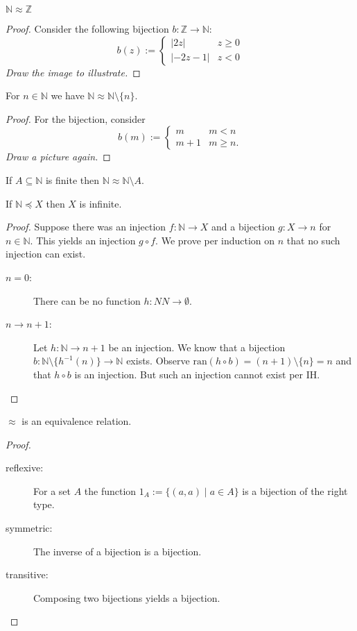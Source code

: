\documentclass{whrartcl}
\newcommand{\NN}{\mathbb{N}}
\newcommand{\ZZ}{\mathbb{Z}}
\newcommand{\ran}{\text{ran}}
\newcommand{\abs}[1]{|#1|}
\begin{document}
\begin{lemma}
  $\NN \approx \ZZ$
\end{lemma}
\begin{proof}
  Consider the following bijection $b : \ZZ \to \NN$:
  \[
    b(z) :=
    \begin{cases}
      \abs{2z} & z \geq 0 \\
      \abs{-2z - 1} & z < 0
    \end{cases}
  \]
  \emph{Draw the image to illustrate.}
\end{proof}

\begin{lemma}
  For $n \in \NN$ we have $\NN \approx \NN \setminus \{n\}$.
\end{lemma}
\begin{proof}
  For the bijection, consider
  \[
    b(m) :=
    \begin{cases}
      m & m < n \\
      m + 1 & m \geq n.
    \end{cases}
  \]
  \emph{Draw a picture again.}
\end{proof}

\begin{corollary}
  If $A \subseteq \NN$ is finite then $\NN \approx \NN \setminus A$.
\end{corollary}

\begin{lemma}
  If $\NN \preceq X$ then $X$ is infinite.
\end{lemma}
\begin{proof}
  Suppose there was an injection $f : \NN \to X$ and a bijection $g : X \to n$
  for $n \in \NN$. This yields an injection $g \circ f$. We prove per induction
  on $n$ that no such injection can exist.
  \begin{description}
  \item[$n = 0$:] There can be no function $h : NN \to \emptyset$.
  \item[$n \to n + 1$:] Let $h : \NN \to n + 1$ be an injection. We know that a
    bijection $b : \NN \setminus \{h^{-1}(n)\} \to \NN$ exists. Observe $\ran(h
    \circ b) = (n + 1) \setminus \{n\} = n$ and that $h \circ b$ is an
    injection. But such an injection cannot exist per IH.
  \end{description}
\end{proof}

\begin{lemma}
  $\approx$ is an equivalence relation.
\end{lemma}
\begin{proof}
  \
  \begin{description}
  \item[reflexive:] For a set $A$ the function $1_A := \{(a, a) \mid a \in A\}$
    is a bijection of the right type.
  \item[symmetric:] The inverse of a bijection is a bijection.
  \item[transitive:] Composing two bijections yields a bijection.
  \end{description}
\end{proof}
\end{document}
